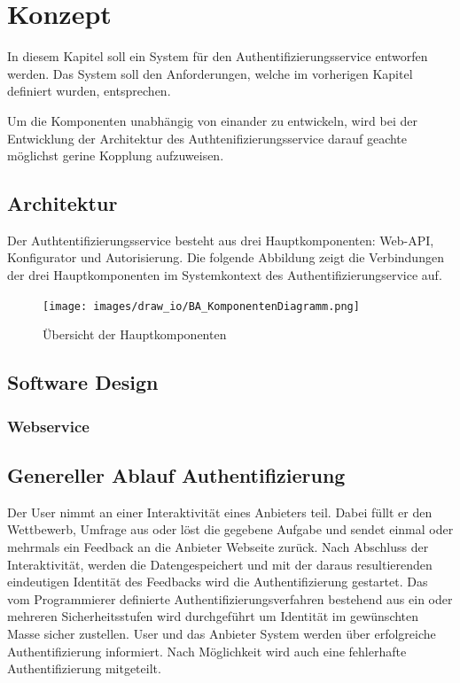 \chapter{Konzept}\label{konzept}

In diesem Kapitel soll ein System für den Authentifizierungsservice
entworfen werden. Das System soll den Anforderungen, welche im
vorherigen Kapitel definiert wurden, entsprechen.

Um die Komponenten unabhängig von einander zu entwickeln, wird bei der
Entwicklung der Architektur des Authtenifizierungsservice darauf geachte
möglichst gerine Kopplung aufzuweisen.

\section{Architektur}\label{architektur}

Der Authtentifizierungsservice besteht aus drei Hauptkomponenten:
Web-API, Konfigurator und Autorisierung. Die folgende Abbildung zeigt
die Verbindungen der drei Hauptkomponenten im Systemkontext des
Authentifizierungservice auf.

\begin{figure}[htbp]
\centering
\texttt{[image: images/draw\_io/BA\_KomponentenDiagramm.png]}
\caption{Übersicht der Hauptkomponenten}
\end{figure}

\section{Software Design}\label{software-design}

\subsection{Webservice}\label{webservice}

\subsection{}\label{section}

\newpage

\section{Genereller Ablauf
Authentifizierung}\label{genereller-ablauf-authentifizierung}

Der User nimmt an einer Interaktivität eines Anbieters teil. Dabei füllt
er den Wettbewerb, Umfrage aus oder löst die gegebene Aufgabe und sendet
einmal oder mehrmals ein Feedback an die Anbieter Webseite zurück. Nach
Abschluss der Interaktivität, werden die Datengespeichert und mit der
daraus resultierenden eindeutigen Identität des Feedbacks wird die
Authentifizierung gestartet. Das vom Programmierer definierte
Authentifizierungsverfahren bestehend aus ein oder mehreren
Sicherheitsstufen wird durchgeführt um Identität im gewünschten Masse
sicher zustellen. User und das Anbieter System werden über erfolgreiche
Authentifizierung informiert. Nach Möglichkeit wird auch eine
fehlerhafte Authentifizierung mitgeteilt.

